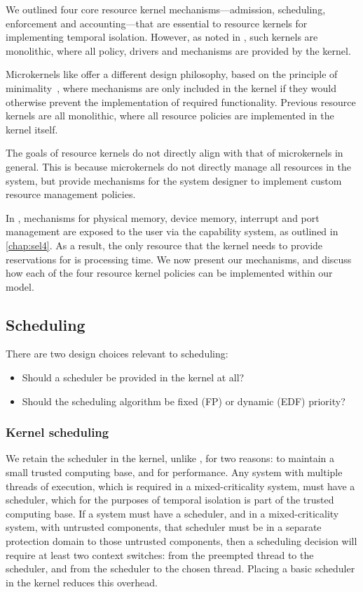 We outlined four core resource kernel mechanisms---admission, scheduling, enforcement and
accounting---that are essential to resource kernels for implementing temporal isolation.  However,
as noted in , such kernels are monolithic, where all policy, drivers and
mechanisms are provided by the kernel.

Microkernels like \selfour offer a different design philosophy, based on the principle of
minimality~\citep{Liedtke_95}, where mechanisms are only included in the kernel if they would
otherwise prevent the implementation of required functionality. Previous resource kernels
are all monolithic, where all resource policies are implemented in the kernel itself.

The goals of resource kernels do not directly align with that of microkernels in general.  This is
because microkernels do not directly manage all resources in the system, but provide mechanisms for
the system designer to implement custom resource management policies.  

In \selfour, mechanisms for physical memory, device memory, interrupt and \IO port management are
exposed to the user via the capability system, as outlined in \cref{chap:sel4}. As a result, the
only resource that the kernel needs to provide reservations for is processing time.  We now present
our mechanisms, and discuss how each of the four resource kernel policies can be implemented within our model.

\subsection{Scheduling}
\label{sec:model-scheduling}

There are two design choices relevant to scheduling:

\begin{itemize} 
    \item Should a scheduler be provided in the kernel at all? 
    \item Should the scheduling algorithm be fixed (\gls{FP}) or dynamic (\gls{EDF}) priority?
\end{itemize}

\subsubsection{Kernel scheduling}

We retain the scheduler in the kernel, unlike \composite, for two reasons: to
maintain a small trusted computing base, and for performance. Any system with
multiple threads of execution, which is required in a mixed-criticality system,
must have a scheduler, which for the purposes of temporal isolation is part of
the trusted computing base. If a system must have a scheduler, and in a
mixed-criticality system, with untrusted components, that scheduler must be in
a separate protection domain to those untrusted components, then a scheduling
decision will require at least two context switches: from the preempted thread
to the scheduler, and from the scheduler to the chosen thread. Placing a basic
scheduler in the kernel reduces this overhead. 


